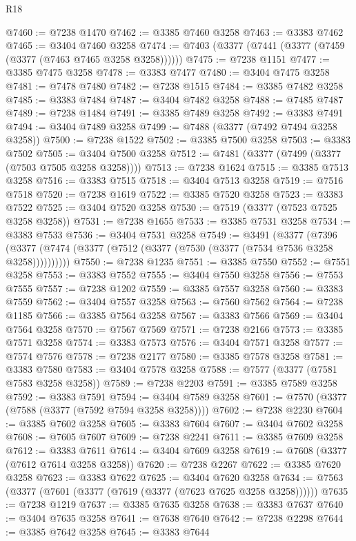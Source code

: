 \begin{lexlean}{R18}
\begin{coremodule}
@7460 := @7238 @1470
@7462 := @3385 @7460 @3258
@7463 := @3383 @7462
@7465 := @3404 @7460 @3258
@7474 := @7403 (@3377 (@7441 (@3377 (@7459 (@3377 (@7463 @7465 @3258 @3258))))))
@7475 := @7238 @1151
@7477 := @3385 @7475 @3258
@7478 := @3383 @7477
@7480 := @3404 @7475 @3258
@7481 := @7478 @7480
@7482 := @7238 @1515
@7484 := @3385 @7482 @3258
@7485 := @3383 @7484
@7487 := @3404 @7482 @3258
@7488 := @7485 @7487
@7489 := @7238 @1484
@7491 := @3385 @7489 @3258
@7492 := @3383 @7491
@7494 := @3404 @7489 @3258
@7499 := @7488 (@3377 (@7492 @7494 @3258 @3258))
@7500 := @7238 @1522
@7502 := @3385 @7500 @3258
@7503 := @3383 @7502
@7505 := @3404 @7500 @3258
@7512 := @7481 (@3377 (@7499 (@3377 (@7503 @7505 @3258 @3258))))
@7513 := @7238 @1624
@7515 := @3385 @7513 @3258
@7516 := @3383 @7515
@7518 := @3404 @7513 @3258
@7519 := @7516 @7518
@7520 := @7238 @1619
@7522 := @3385 @7520 @3258
@7523 := @3383 @7522
@7525 := @3404 @7520 @3258
@7530 := @7519 (@3377 (@7523 @7525 @3258 @3258))
@7531 := @7238 @1655
@7533 := @3385 @7531 @3258
@7534 := @3383 @7533
@7536 := @3404 @7531 @3258
@7549 := @3491
    (@3377
      (@7396 (@3377 (@7474 (@3377 (@7512 (@3377 (@7530 (@3377 (@7534 @7536 @3258 @3258))))))))))
@7550 := @7238 @1235
@7551 := @3385 @7550
@7552 := @7551 @3258
@7553 := @3383 @7552
@7555 := @3404 @7550 @3258
@7556 := @7553 @7555
@7557 := @7238 @1202
@7559 := @3385 @7557 @3258
@7560 := @3383 @7559
@7562 := @3404 @7557 @3258
@7563 := @7560 @7562
@7564 := @7238 @1185
@7566 := @3385 @7564 @3258
@7567 := @3383 @7566
@7569 := @3404 @7564 @3258
@7570 := @7567 @7569
@7571 := @7238 @2166
@7573 := @3385 @7571 @3258
@7574 := @3383 @7573
@7576 := @3404 @7571 @3258
@7577 := @7574 @7576
@7578 := @7238 @2177
@7580 := @3385 @7578 @3258
@7581 := @3383 @7580
@7583 := @3404 @7578 @3258
@7588 := @7577 (@3377 (@7581 @7583 @3258 @3258))
@7589 := @7238 @2203
@7591 := @3385 @7589 @3258
@7592 := @3383 @7591
@7594 := @3404 @7589 @3258
@7601 := @7570 (@3377 (@7588 (@3377 (@7592 @7594 @3258 @3258))))
@7602 := @7238 @2230
@7604 := @3385 @7602 @3258
@7605 := @3383 @7604
@7607 := @3404 @7602 @3258
@7608 := @7605 @7607
@7609 := @7238 @2241
@7611 := @3385 @7609 @3258
@7612 := @3383 @7611
@7614 := @3404 @7609 @3258
@7619 := @7608 (@3377 (@7612 @7614 @3258 @3258))
@7620 := @7238 @2267
@7622 := @3385 @7620 @3258
@7623 := @3383 @7622
@7625 := @3404 @7620 @3258
@7634 := @7563 (@3377 (@7601 (@3377 (@7619 (@3377 (@7623 @7625 @3258 @3258))))))
@7635 := @7238 @1219
@7637 := @3385 @7635 @3258
@7638 := @3383 @7637
@7640 := @3404 @7635 @3258
@7641 := @7638 @7640
@7642 := @7238 @2298
@7644 := @3385 @7642 @3258
@7645 := @3383 @7644

\end{coremodule}
\end{lexlean}

